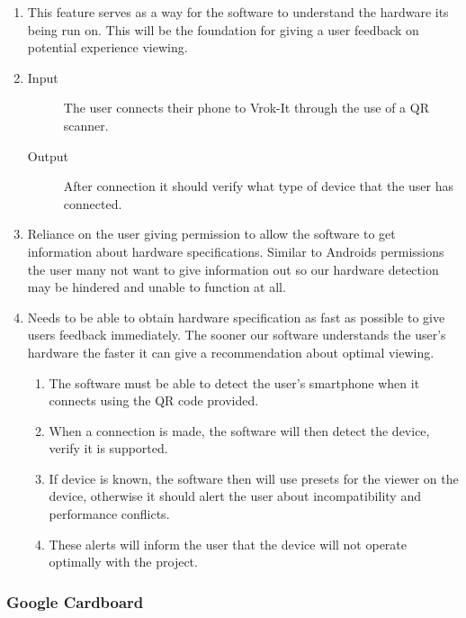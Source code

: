 \documentclass[letterpaper, 10pt, draftclsnofoot, compsoc, onecolumn]{IEEEtran}
\begin{document}
\begin{enumerate}
	\item This feature serves as a way for the software to understand the hardware its being run on. This will be the foundation for 
	giving a user feedback on potential experience viewing.

	\item
	\begin{description}
		\item[Input] The user connects their phone to Vrok-It through the use of a QR scanner. 
		\item[Output] After connection it should verify what type of device that the user has connected.
	\end{description}

	\item	Reliance on the user giving permission to allow the software to get information about hardware specifications. Similar to 
	Androids permissions the user many not want to give information out so our hardware detection may be hindered and 
	unable to function at all. 

	\item Needs to be able to obtain hardware specification as fast as possible to give users feedback immediately. The sooner 
	our software understands the user's hardware the faster it can give a recommendation about optimal viewing. 

	\begin{enumerate}
		\item The software must be able to detect the user's smartphone when it connects using the QR code provided. 
		\item When a connection is made, the software will then detect the device, verify it is supported. 
		\item If device is known, the software then will use presets for the viewer on the device, otherwise
		it should alert the user about incompatibility and performance conflicts. 
		\item These alerts will inform the user that the device will not operate optimally with the project. 
	\end{enumerate}
\end{enumerate}

\subsubsection{Google Cardboard}
\end{document}
